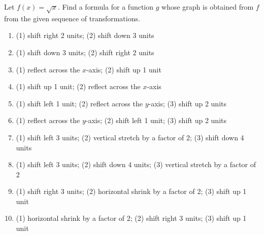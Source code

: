Let $f(x) = \sqrt{x}$.  Find a formula for a function $g$ whose graph is obtained from $f$ from the given sequence of transformations. 

\begin{enumerate}
\setcounter{enumi}{\value{HW}}


\item  (1) shift right 2 units; (2) shift down 3 units

\item  (1) shift down 3 units; (2) shift right 2 units

\item  (1) reflect across the $x$-axis; (2) shift up 1 unit

\item  (1) shift up 1 unit; (2) reflect across the $x$-axis

\item  (1) shift left 1 unit; (2) reflect across the $y$-axis; (3) shift up 2 units

\item  (1) reflect across the $y$-axis;  (2) shift left 1 unit;  (3) shift up 2 units

\item  (1) shift left 3 units; (2) vertical stretch by a factor of 2; (3) shift down 4 units

\item  (1) shift left 3 units; (2) shift down 4 units; (3) vertical stretch by a factor of 2

\item  (1) shift right 3 units; (2) horizontal shrink by a factor of 2; (3) shift up 1 unit

\item  (1) horizontal shrink by a factor of 2; (2) shift right 3 units; (3) shift up 1 unit


\setcounter{HW}{\value{enumi}}
\end{enumerate}

